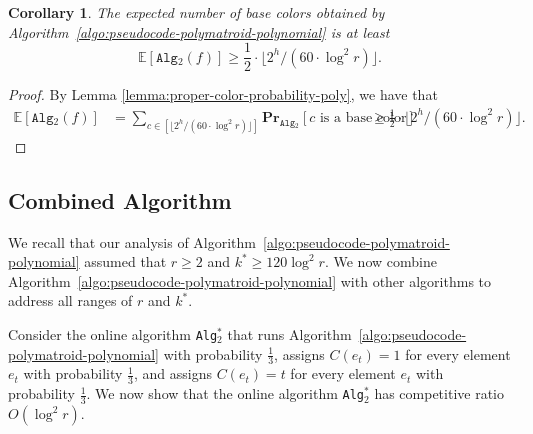 \documentclass[11pt]{article}
\newtheorem{corollary}{Corollary}
\theoremstyle{definition}
\begin{document}
\begin{corollary}\label{corollary:number-proper-colors-poly}
    The expected number of base colors obtained by Algorithm~\ref{algo:pseudocode-polymatroid-polynomial} is at least $$\mathbb{E}[\texttt{Alg$_2$}(f)]\geq \frac{1}{2}\cdot \lfloor 2^h/ (60\cdot \log^2 r)\rfloor.$$
\end{corollary}
\begin{proof}
By Lemma \ref{lemma:proper-color-probability-poly}, we have that 
    $$\begin{aligned}
        \mathbb{E}[\texttt{Alg$_2$}(f)] &= \sum_{c\in [\lfloor 2^h/ (60\cdot \log^2 r)\rfloor]} \mathbf{Pr}_{\texttt{Alg$_2$} }[c \text{ is a base color}] 
&\ge \frac{1}{2}\cdot \lfloor 2^h/ (60\cdot \log^2 r)\rfloor.
    \end{aligned}$$
\end{proof}

\subsection{Combined Algorithm}
We recall that our analysis of Algorithm~\ref{algo:pseudocode-polymatroid-polynomial} assumed that $r\geq 2$ and $k^*\geq 120\log^2 r$. We now combine Algorithm~\ref{algo:pseudocode-polymatroid-polynomial} with other algorithms to address all ranges of $r$ and $k^*$.

Consider the online algorithm \texttt{Alg$_2^*$} that runs Algorithm~\ref{algo:pseudocode-polymatroid-polynomial} with probability $\frac{1}{3}$, assigns $C(e_t)=1$ for every element $e_t$ with probability $\frac{1}{3}$, and assigns $C(e_t)=t$ for every element $e_t$ with probability $\frac{1}{3}$. We now show that the online algorithm \texttt{Alg$_2^*$} has competitive ratio $O(\log^2 r)$.
\end{document}
